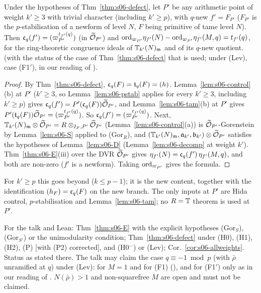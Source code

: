 \begin{corollary}\label{cor:s06-allweights}
Under the hypotheses of Thm~\ref{thm:s06-defect}, let $P'$ be any arithmetic point of weight $k'\ge3$ with trivial character
(including $k'\ge p$), with $q$-new $f'=F_{P'}$ ($F_{P'}$ is the $p$-stabilisation of a newform of level $N$, $F$ being primitive of tame level $N$). Then $\mathfrak{c}_q(f')=(\varpi_{P'}^{t_{f'}(q)})$ (in $\widetilde{\mathcal{O}}_{P'}$) and
$\mathrm{ord}_{\varpi_{P'}}\eta_{f'}(N)-\mathrm{ord}_{\varpi_{P'}}\eta_{f'}(M,q)=t_{f'}(q)$, for the ring-theoretic congruence ideals of $\mathbb{T}_{k'}(N)_{\mathfrak{m}}$ and of its
$q$-new quotient. \stpmc{} (with the status of the case of Thm~\ref{thm:s06-defect} that is used; under (Lev), case (F1$'$), in our reading of \cite[Thm~3.14]{KO}).
\end{corollary}
\begin{proof}
By Thm~\ref{thm:s06-defect}, $\mathfrak{c}_q(F)=\mathfrak{t}_q(F)=(h)$. Lemma~\ref{lem:s06-control}(b) at $P'$ ($k'\ge3$, so Lemma~\ref{lem:s06-pstab}
applies for every $k'\ge3$, including $k'\ge p$) gives $\mathfrak{c}_q(f')=P'(\mathfrak{c}_q(F))\widetilde{\mathcal{O}}_{P'}$, and Lemma~\ref{lem:s06-tam}(b) at $P'$ gives
$P'(\mathfrak{t}_q(F))\widetilde{\mathcal{O}}_{P'}=(\varpi_{P'}^{t_{f'}(q)})$. So $\mathfrak{c}_q(f')=(\varpi_{P'}^{t_{f'}(q)})$. Next, $\mathbb{T}_{k'}(N)_{\mathfrak{m}}\otimes\widetilde{\mathcal{O}}_{P'}=R\otimes_{I_F,P'}\widetilde{\mathcal{O}}_{P'}$
(Lemma~\ref{lem:s06-control}(a)) is $\widetilde{\mathcal{O}}_{P'}$-Gorenstein by Lemma~\ref{lem:s06-S} applied to (Gor$_R$), and
$(\mathbb{T}_{k'}(N)_{\mathfrak{m}},\mathfrak{a}_{k'},\mathfrak{b}_{k'})\otimes\widetilde{\mathcal{O}}_{P'}$ satisfies the hypotheses of Lemma~\ref{lem:s06-D} (Lemma~\ref{lem:s06-decomp} at weight
$k'$). Thm~\ref{thm:s06-E}(iii) over the DVR $\widetilde{\mathcal{O}}_{P'}$ gives $\eta_{f'}(N)=\mathfrak{c}_q(f')\,\eta_{f'}(M,q)$, and both are non-zero
($f'$ is a newform). Taking $\mathrm{ord}_{\varpi_{P'}}$ gives the formula.
\end{proof}
\noindent For $k'\ge p$ this goes beyond \cite{KO} ($k\le p-1$); it is the new content, together with the identification $(h_F)=\mathfrak{c}_q(F)$
on the new branch. The only inputs at $P'$ are Hida control, $p$-stabilisation and Lemma~\ref{lem:s06-tam}; no $R=\mathbb{T}$ theorem is
used at $P'$.

\begin{interface}\label{if:s06-defect}
For the talk and Lean: Thm~\ref{thm:s06-E} with the explicit hypotheses (Gor$_S$), (Gor$_{S'}$) or the unimodularity condition;
Thm~\ref{thm:s06-defect} under (H0), (H1), (H2), (P) [with (P2) corrected], and (H0$^-$) or (Lev); Cor.~\ref{cor:s06-allweights}.
Status as stated there. The talk may claim the case $q\equiv-1\bmod p$ (with $\bar\rho$ unramified at $q$) under (Lev): for
$M=1$ and for (F1) (\stpmc), and for (F1$'$) only as \stpmc{} in our reading of \cite[Thm~3.14]{KO}. $N(\bar\rho)>1$ and non-squarefree $M$ are open and must not
be claimed.

\end{interface}

